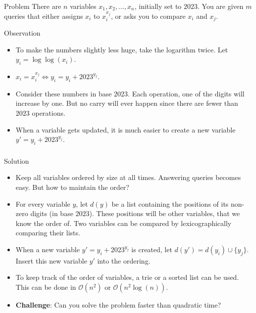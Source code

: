 \begin{frame}
    \frametitle{\problemtitle}
    \begin{block}{Problem}
        There are $n$ variables $x_1, x_2, \dots, x_n$, initially set to $2023$.
        You are given $m$ queries that either assigns $x_i$ to $x_i^{x_j}$, or
        asks you to compare $x_i$ and $x_j$.
    \end{block}
    \pause
    \begin{block}{Observation}
        \begin{itemize}
            \item<+-> To make the numbers slightly less huge, take the logarithm twice. Let
            $y_i = \log\log(x_i)$.
            \item<+-> $x_i = x_i^{x_j} \Longleftrightarrow y_i = y_i + 2023^{y_j}$.
            \item<+-> Consider these numbers in base $2023$.
            Each operation, one of the digits will increase by one. But no carry will ever happen since
            there are fewer than $2023$ operations.
            \item<+-> When a variable gets updated, it is much easier to
            create a new variable $y' = y_i + 2023^{y_j}$.
        \end{itemize}
    \end{block}
\end{frame}

\begin{frame}
    \frametitle{\problemtitle}
    \begin{block}{Solution}
        \begin{itemize}
            \item<+-> Keep all variables ordered by size at all times. 
            Answering queries becomes easy. But how to maintain the order? 
            \item<+-> For every variable $y$, let $d(y)$ be a list containing the positions of its non-zero digits (in base $2023$). 
            These positions will be other variables, that we know the order of.
            Two variables can be compared by lexicographically comparing their lists.
            \item<+-> When a new variable $y' = y_i + 2023^{y_j}$ is created, let $d(y') = d(y_i) \cup \{y_j\}$.
            Insert this new variable $y'$ into the ordering. 
            \item<+-> To keep track of the order of variables, a trie or a sorted list can be used.
            This can be done in $\mathcal{O}(n^2)$ or $\mathcal{O}(n^2\log(n))$.
            \item<+-> \textbf{Challenge}: Can you solve the problem faster than quadratic time?
        \end{itemize}
    \end{block}
    \solvestats
\end{frame}
